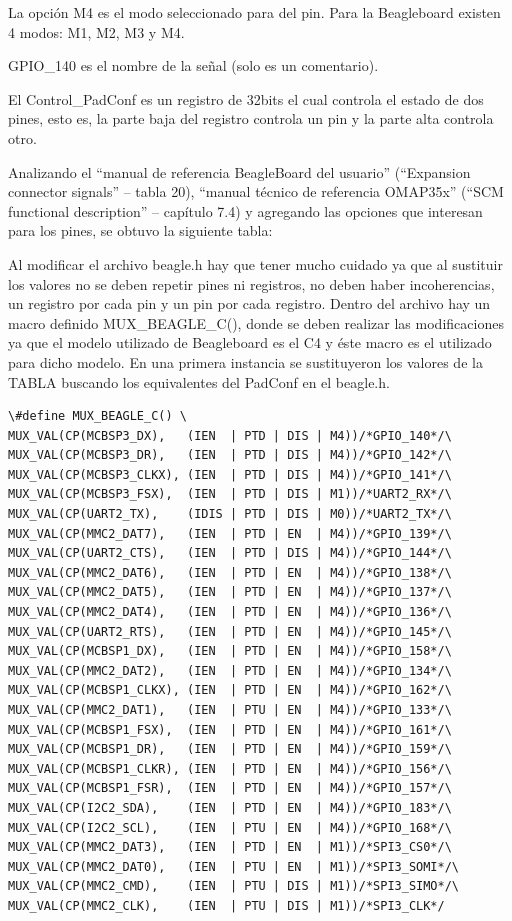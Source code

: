 La opción M4 es el modo seleccionado para del pin. Para la Beagleboard existen 4 modos: M1, M2, M3 y M4.

GPIO\_140 es el nombre de la señal (solo es un comentario). 

\bigskip
El Control\_PadConf es un registro de 32bits el cual controla el estado de dos pines, esto es, la parte 
baja del registro controla un pin y la parte alta controla otro. 

\bigskip
Analizando el “manual de referencia BeagleBoard del usuario” (“Expansion connector signals” – 
tabla 20), “manual técnico de referencia OMAP35x” (“SCM functional description” – capítulo 7.4) 
y agregando las opciones que interesan para los pines, se obtuvo la siguiente tabla: 

\bigskip
Al modificar el archivo beagle.h hay que tener mucho cuidado ya que al sustituir los valores no se deben repetir pines ni registros, no deben haber incoherencias, un registro por cada pin y un pin por cada registro. 
Dentro del archivo hay un macro definido MUX\_BEAGLE\_C(), donde se deben realizar las modificaciones ya que el modelo utilizado de Beagleboard es el C4 y éste macro es el utilizado para dicho modelo.
En una primera instancia se sustituyeron los valores de la TABLA buscando los equivalentes del 
PadConf en el beagle.h. 


\begin{verbatim}
\#define MUX_BEAGLE_C() \
MUX_VAL(CP(MCBSP3_DX),   (IEN  | PTD | DIS | M4))/*GPIO_140*/\
MUX_VAL(CP(MCBSP3_DR),   (IEN  | PTD | DIS | M4))/*GPIO_142*/\
MUX_VAL(CP(MCBSP3_CLKX), (IEN  | PTD | DIS | M4))/*GPIO_141*/\
MUX_VAL(CP(MCBSP3_FSX),  (IEN  | PTD | DIS | M1))/*UART2_RX*/\
MUX_VAL(CP(UART2_TX),    (IDIS | PTD | DIS | M0))/*UART2_TX*/\
MUX_VAL(CP(MMC2_DAT7),   (IEN  | PTD | EN  | M4))/*GPIO_139*/\
MUX_VAL(CP(UART2_CTS),   (IEN  | PTD | DIS | M4))/*GPIO_144*/\
MUX_VAL(CP(MMC2_DAT6),   (IEN  | PTD | EN  | M4))/*GPIO_138*/\
MUX_VAL(CP(MMC2_DAT5),   (IEN  | PTD | EN  | M4))/*GPIO_137*/\
MUX_VAL(CP(MMC2_DAT4),   (IEN  | PTD | EN  | M4))/*GPIO_136*/\
MUX_VAL(CP(UART2_RTS),   (IEN  | PTD | EN  | M4))/*GPIO_145*/\
MUX_VAL(CP(MCBSP1_DX),   (IEN  | PTD | EN  | M4))/*GPIO_158*/\
MUX_VAL(CP(MMC2_DAT2),   (IEN  | PTD | EN  | M4))/*GPIO_134*/\
MUX_VAL(CP(MCBSP1_CLKX), (IEN  | PTD | EN  | M4))/*GPIO_162*/\
MUX_VAL(CP(MMC2_DAT1),   (IEN  | PTU | EN  | M4))/*GPIO_133*/\
MUX_VAL(CP(MCBSP1_FSX),  (IEN  | PTD | EN  | M4))/*GPIO_161*/\
MUX_VAL(CP(MCBSP1_DR),   (IEN  | PTD | EN  | M4))/*GPIO_159*/\
MUX_VAL(CP(MCBSP1_CLKR), (IEN  | PTD | EN  | M4))/*GPIO_156*/\
MUX_VAL(CP(MCBSP1_FSR),  (IEN  | PTD | EN  | M4))/*GPIO_157*/\
MUX_VAL(CP(I2C2_SDA),    (IEN  | PTD | EN  | M4))/*GPIO_183*/\
MUX_VAL(CP(I2C2_SCL),    (IEN  | PTU | EN  | M4))/*GPIO_168*/\
MUX_VAL(CP(MMC2_DAT3),   (IEN  | PTD | EN  | M1))/*SPI3_CS0*/\
MUX_VAL(CP(MMC2_DAT0),   (IEN  | PTU | EN  | M1))/*SPI3_SOMI*/\
MUX_VAL(CP(MMC2_CMD),    (IEN  | PTU | DIS | M1))/*SPI3_SIMO*/\
MUX_VAL(CP(MMC2_CLK),    (IEN  | PTU | DIS | M1))/*SPI3_CLK*/
\end{verbatim}

